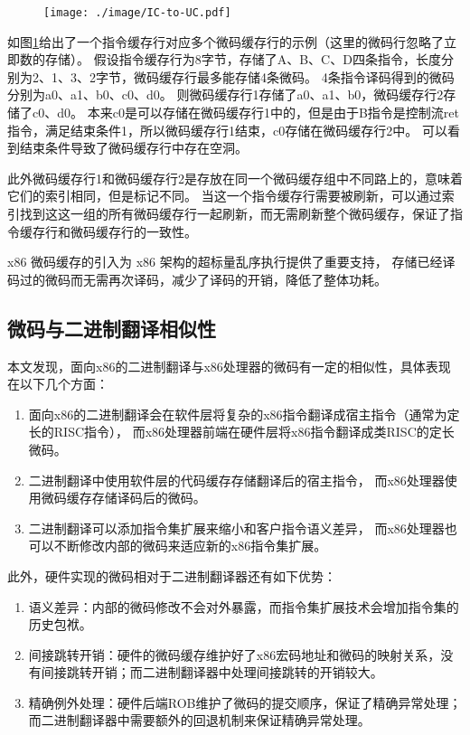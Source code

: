 \begin{figure}[!htbp]
  \centering
  \texttt{[image: ./image/IC-to-UC.pdf]}
  \label{img:IC_to_UC}
\end{figure}

如图\ref{img:IC_to_UC}给出了一个指令缓存行对应多个微码缓存行的示例（这里的微码行忽略了立即数的存储）。
假设指令缓存行为8字节，存储了A、B、C、D四条指令，长度分别为2、1、3、2字节，微码缓存行最多能存储4条微码。
4条指令译码得到的微码分别为a0、a1、b0、c0、d0。
则微码缓存行1存储了a0、a1、b0，微码缓存行2存储了c0、d0。
本来c0是可以存储在微码缓存行1中的，但是由于B指令是控制流ret指令，满足结束条件1，所以微码缓存行1结束，c0存储在微码缓存行2中。
可以看到结束条件导致了微码缓存行中存在空洞。

此外微码缓存行1和微码缓存行2是存放在同一个微码缓存组中不同路上的，意味着它们的索引相同，但是标记不同。
当这一个指令缓存行需要被刷新，可以通过索引找到这这一组的所有微码缓存行一起刷新，而无需刷新整个微码缓存，保证了指令缓存行和微码缓存行的一致性。

x86 微码缓存的引入为 x86 架构的超标量乱序执行提供了重要支持，
存储已经译码过的微码而无需再次译码，减少了译码的开销，降低了整体功耗。

\subsection{微码与二进制翻译相似性}

本文发现，面向x86的二进制翻译与x86处理器的微码有一定的相似性，具体表现在以下几个方面：

\begin{enumerate}
\item 面向x86的二进制翻译会在软件层将复杂的x86指令翻译成宿主指令（通常为定长的RISC指令），
而x86处理器前端在硬件层将x86指令翻译成类RISC的定长微码。
\item 二进制翻译中使用软件层的代码缓存存储翻译后的宿主指令，
而x86处理器使用微码缓存存储译码后的微码。
\item 二进制翻译可以添加指令集扩展来缩小和客户指令语义差异，
而x86处理器也可以不断修改内部的微码来适应新的x86指令集扩展。
\end{enumerate}

此外，硬件实现的微码相对于二进制翻译器还有如下优势：

\begin{enumerate}
\item 语义差异：内部的微码修改不会对外暴露，而指令集扩展技术会增加指令集的历史包袱。
\item 间接跳转开销：硬件的微码缓存维护好了x86宏码地址和微码的映射关系，没有间接跳转开销；而二进制翻译器中处理间接跳转的开销较大。
\item 精确例外处理：硬件后端ROB维护了微码的提交顺序，保证了精确异常处理；而二进制翻译器中需要额外的回退机制来保证精确异常处理。
\end{enumerate}


